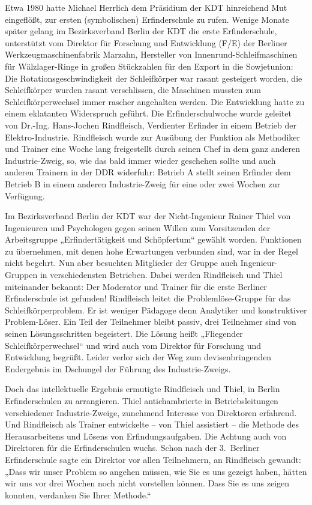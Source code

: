 \documentclass[11pt,a4paper]{article}
\begin{document}
Etwa 1980 hatte Michael Herrlich dem Präsidium der KDT hinreichend Mut
eingeflößt, zur ersten (symbolischen) Erfinderschule zu rufen. Wenige Monate
später gelang im Bezirksverband Berlin der KDT die erste Erfinderschule,
unterstützt vom Direktor für Forschung und Entwicklung (F/E) der Berliner
Werkzeugmaschinenfabrik Marzahn, Hersteller von Innenrund-Schleifmaschinen für
Wälzlager-Ringe in großen Stückzahlen für den Export in die Sowjetunion: Die
Rotationsgeschwindigkeit der Schleifkörper war rasant gesteigert worden, die
Schleifkörper wurden rasant verschlissen, die Maschinen mussten zum
Schleifkörperwechsel immer rascher angehalten werden. Die Entwicklung hatte zu
einem eklatanten Widerspruch geführt. Die Erfinderschulwoche wurde geleitet von
Dr.-Ing. Hans-Jochen Rindfleisch, Verdienter Erfinder in einem Betrieb der
Elektro-Industrie.  Rindfleisch wurde zur Ausübung der Funktion als Methodiker
und Trainer eine Woche lang freigestellt durch seinen Chef in dem ganz anderen
Industrie-Zweig, so, wie das bald immer wieder geschehen sollte und auch
anderen Trainern in der DDR widerfuhr: Betrieb A stellt seinen Erfinder dem
Betrieb B in einem anderen Industrie-Zweig für eine oder zwei Wochen zur
Verfügung.

Im Bezirksverband Berlin der KDT war der Nicht-Ingenieur Rainer Thiel von
Ingenieuren und Psychologen gegen seinen Willen zum Vorsitzenden der
Arbeitsgruppe „Erfindertätigkeit und Schöpfertum“ gewählt worden.  Funktionen
zu übernehmen, mit denen hohe Erwartungen verbunden sind, war in der Regel
nicht begehrt. Nun aber besuchten Mitglieder der Gruppe auch Ingenieur-Gruppen
in verschiedensten Betrieben. Dabei werden Rindfleisch und Thiel miteinander
bekannt: Der Moderator und Trainer für die erste Berliner Erfinderschule ist
gefunden! Rindfleisch leitet die Problemlöse-Gruppe für das
Schleifkörperproblem. Er ist weniger Pädagoge denn Analytiker und konstruktiver
Problem-Löser. Ein Teil der Teilnehmer bleibt passiv, drei Teilnehmer sind von
seinen Lösungsschritten begeistert.  Die Lösung heißt „Fliegender
Schleifkörperwechsel“ und wird auch vom Direktor für Forschung und Entwicklung
begrüßt. Leider verlor sich der Weg zum devisenbringenden Endergebnis im
Dschungel der Führung des Industrie-Zweigs.

Doch das intellektuelle Ergebnis ermutigte Rindfleisch und Thiel, in Berlin
Erfinderschulen zu arrangieren. Thiel antichambrierte in Betriebsleitungen
verschiedener Industrie-Zweige, zunehmend Interesse von Direktoren
erfahrend. Und Rindfleisch als Trainer entwickelte – von Thiel assistiert --
die Methode des Herausarbeitens und Lösens von Erfindungsaufgaben. Die Achtung
auch von Direktoren für die Erfinderschulen wuchs. Schon nach der 3.~Berliner
Erfinderschule sagte ein Direktor vor allen Teilnehmern, an Rindfleisch
gewandt: „Dass wir unser Problem so angehen müssen, wie Sie es uns gezeigt
haben, hätten wir uns vor drei Wochen noch nicht vorstellen können. Dass Sie es
uns zeigen konnten, verdanken Sie Ihrer Methode.“
\end{document}

